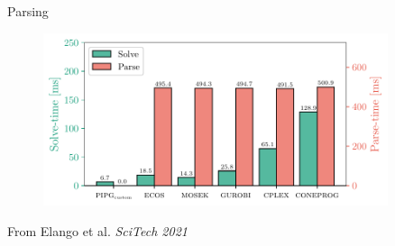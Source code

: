 \documentclass[aspectratio=169]{beamer}
\begin{document}
\begin{frame}{Parsing}
    \begin{figure}
        \includegraphics[width=0.90\textwidth]{img/bar_lqr_N30.pdf}
    \end{figure}

\vspace{0.25cm} 

{\footnotesize \color{gray} From Elango et al. \emph{SciTech 2021}}    
\end{frame}
\end{document}
